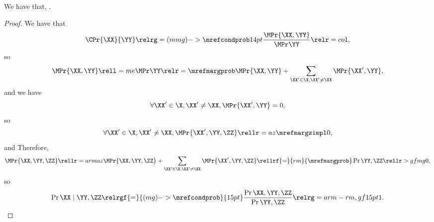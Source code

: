 \begin{proposition}
  We have that, \ponecindprop.%
\end{proposition}

\begin{proof}
  We have that 
  $$\CPr{\XX}{\YY} \relrg = (mmg)->{\mrefcondprob} 14pt \frac{\MPr{\XX, \YY}}{\MPr\YY} \relr = co 1,$$
  so 
  \def\notx{\XX' \in \X, \XX' \ne \XX}
  $$\MPr{\XX, \YY} \rell = me \MPr\YY \relr = {\mrefmargprob} \MPr{\XX, \YY} + \sum_{\notx}\MPr{\XX', \YY},$$
  and we have
  $$\forall \notx, \MPr{\XX',\YY} = 0,$$
  so
  $$\forall \notx, \MPr{\XX',\YY,\ZZ} \rellr = az {\mrefmargzimpl} 0,$$
  and
  Therefore, $$\MPr{\XX,\YY,\ZZ} \rellr = arm az \MPr{\XX,\YY,\ZZ} + \sum_{\notx}\MPr{\XX',\YY,\ZZ}
  \rellrf{=}{rm}{\mrefmargprob} \Pr{\YY, \ZZ} \rellr > gf mg 0,$$
  so $$\Pr{\XX \mid \YY, \ZZ} 
  \relrgf{=}{(mg)->\mrefcondprob}{15pt} \frac{\Pr{\XX, \YY, \ZZ}}{\Pr{\YY, \ZZ}} 
  \relrg = arm-rm,gf 15pt 1.$$%
\end{proof}
